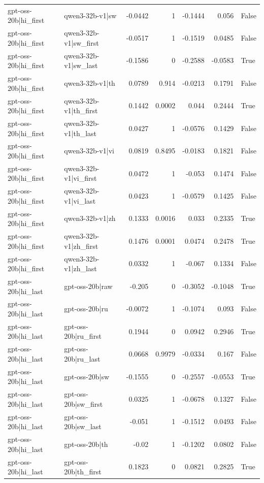 \begin{table}
\begin{tabular}{l l r r r r l}
gpt-oss-20b|hi_first & qwen3-32b-v1|sw & -0.0442 & 1 & -0.1444 & 0.056 & False \\
gpt-oss-20b|hi_first & qwen3-32b-v1|sw_first & -0.0517 & 1 & -0.1519 & 0.0485 & False \\
gpt-oss-20b|hi_first & qwen3-32b-v1|sw_last & -0.1586 & 0 & -0.2588 & -0.0583 & True \\
gpt-oss-20b|hi_first & qwen3-32b-v1|th & 0.0789 & 0.914 & -0.0213 & 0.1791 & False \\
gpt-oss-20b|hi_first & qwen3-32b-v1|th_first & 0.1442 & 0.0002 & 0.044 & 0.2444 & True \\
gpt-oss-20b|hi_first & qwen3-32b-v1|th_last & 0.0427 & 1 & -0.0576 & 0.1429 & False \\
gpt-oss-20b|hi_first & qwen3-32b-v1|vi & 0.0819 & 0.8495 & -0.0183 & 0.1821 & False \\
gpt-oss-20b|hi_first & qwen3-32b-v1|vi_first & 0.0472 & 1 & -0.053 & 0.1474 & False \\
gpt-oss-20b|hi_first & qwen3-32b-v1|vi_last & 0.0423 & 1 & -0.0579 & 0.1425 & False \\
gpt-oss-20b|hi_first & qwen3-32b-v1|zh & 0.1333 & 0.0016 & 0.033 & 0.2335 & True \\
gpt-oss-20b|hi_first & qwen3-32b-v1|zh_first & 0.1476 & 0.0001 & 0.0474 & 0.2478 & True \\
gpt-oss-20b|hi_first & qwen3-32b-v1|zh_last & 0.0332 & 1 & -0.067 & 0.1334 & False \\
gpt-oss-20b|hi_last & gpt-oss-20b|raw & -0.205 & 0 & -0.3052 & -0.1048 & True \\
gpt-oss-20b|hi_last & gpt-oss-20b|ru & -0.0072 & 1 & -0.1074 & 0.093 & False \\
gpt-oss-20b|hi_last & gpt-oss-20b|ru_first & 0.1944 & 0 & 0.0942 & 0.2946 & True \\
gpt-oss-20b|hi_last & gpt-oss-20b|ru_last & 0.0668 & 0.9979 & -0.0334 & 0.167 & False \\
gpt-oss-20b|hi_last & gpt-oss-20b|sw & -0.1555 & 0 & -0.2557 & -0.0553 & True \\
gpt-oss-20b|hi_last & gpt-oss-20b|sw_first & 0.0325 & 1 & -0.0678 & 0.1327 & False \\
gpt-oss-20b|hi_last & gpt-oss-20b|sw_last & -0.051 & 1 & -0.1512 & 0.0493 & False \\
gpt-oss-20b|hi_last & gpt-oss-20b|th & -0.02 & 1 & -0.1202 & 0.0802 & False \\
gpt-oss-20b|hi_last & gpt-oss-20b|th_first & 0.1823 & 0 & 0.0821 & 0.2825 & True \\

\end{tabular}
\end{table}
